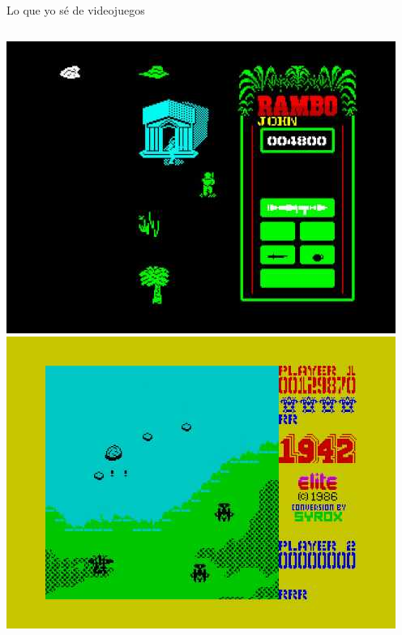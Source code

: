 \begin{frame}[t]{Lo que yo sé de videojuegos}
\begin{columns}[T]
\includegraphics[width=.6\textwidth]{figs/rambo}
\vspace{1cm}
\includegraphics[width=.6\textwidth]{figs/1942}

\end{columns}
\end{frame}
